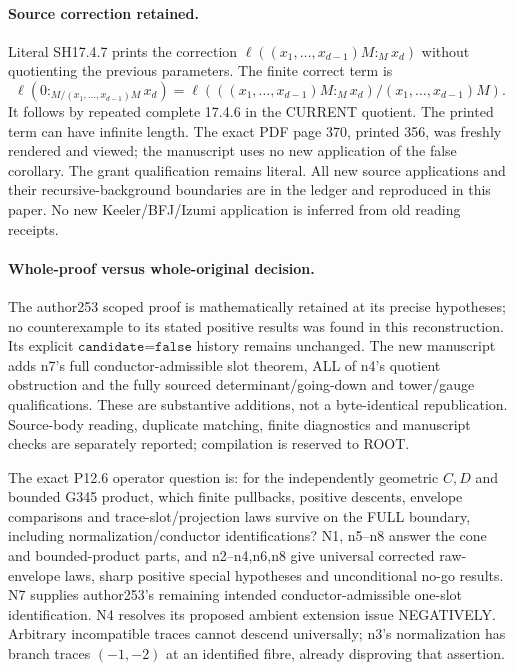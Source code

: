 \paragraph{Source correction retained.}
Literal SH17.4.7 prints the correction $\ell((x_1,\ldots,x_{d-1})M:_Mx_d)$ without quotienting the previous parameters. The finite correct term is
\[
 \ell(0:_{M/(x_1,\ldots,x_{d-1})M}x_d)
 =\ell\left(((x_1,\ldots,x_{d-1})M:_Mx_d)/(x_1,\ldots,x_{d-1})M\right).
\]
It follows by repeated complete 17.4.6 in the CURRENT quotient. The printed term can have infinite length. The exact PDF page 370, printed 356, was freshly rendered and viewed; the manuscript uses no new application of the false corollary. The grant qualification remains literal. All new source applications and their recursive-background boundaries are in the ledger and reproduced in this paper. No new Keeler/BFJ/Izumi application is inferred from old reading receipts.

\paragraph{Whole-proof versus whole-original decision.}
The author253 scoped proof is mathematically retained at its precise hypotheses; no counterexample to its stated positive results was found in this reconstruction. Its explicit $\texttt{candidate=false}$ history remains unchanged. The new manuscript adds n7's full conductor-admissible slot theorem, ALL of n4's quotient obstruction and the fully sourced determinant/going-down and tower/gauge qualifications. These are substantive additions, not a byte-identical republication. Source-body reading, duplicate matching, finite diagnostics and manuscript checks are separately reported; compilation is reserved to ROOT.

The exact P12.6 operator question is: for the independently geometric $C,D$ and bounded G345 product, which finite pullbacks, positive descents, envelope comparisons and trace-slot/projection laws survive on the FULL boundary, including normalization/conductor identifications? N1, n5--n8 answer the cone and bounded-product parts, and n2--n4,n6,n8 give universal corrected raw-envelope laws, sharp positive special hypotheses and unconditional no-go results. N7 supplies author253's remaining intended conductor-admissible one-slot identification. N4 resolves its proposed ambient extension issue NEGATIVELY. Arbitrary incompatible traces cannot descend universally; n3's normalization has branch traces $(-1,-2)$ at an identified fibre, already disproving that assertion.

